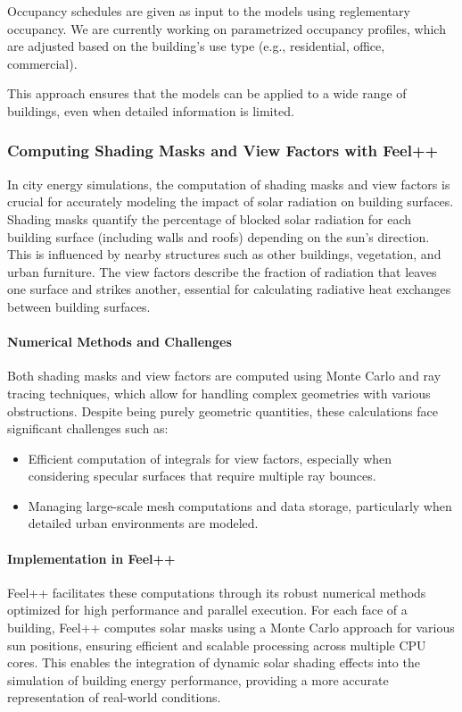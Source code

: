 \documentclass[runningheads]{llncs}
\begin{document}
Occupancy schedules are given as input to the models using reglementary occupancy.
We are currently working on parametrized occupancy profiles, which are adjusted based on the building's use type (e.g., residential, office, commercial).

This approach ensures that the models can be applied to a wide range of buildings, even when detailed information is limited.

\subsubsection{Computing Shading Masks and View Factors with Feel++}

In city energy simulations, the computation of shading masks and view factors is crucial for accurately modeling the impact of solar radiation on building surfaces. Shading masks quantify the percentage of blocked solar radiation for each building surface (including walls and roofs) depending on the sun's direction. This is influenced by nearby structures such as other buildings, vegetation, and urban furniture. The view factors describe the fraction of radiation that leaves one surface and strikes another, essential for calculating radiative heat exchanges between building surfaces.

\paragraph{Numerical Methods and Challenges}
Both shading masks and view factors are computed using Monte Carlo and ray tracing techniques, which allow for handling complex geometries with various obstructions. Despite being purely geometric quantities, these calculations face significant challenges such as:
\begin{itemize}
    \item Efficient computation of integrals for view factors, especially when considering specular surfaces that require multiple ray bounces.
    \item Managing large-scale mesh computations and data storage, particularly when detailed urban environments are modeled.
\end{itemize}

\paragraph{Implementation in Feel++}
Feel++ facilitates these computations through its robust numerical methods optimized for high performance and parallel execution. For each face of a building, Feel++ computes solar masks using a Monte Carlo approach for various sun positions, ensuring efficient and scalable processing across multiple CPU cores. This enables the integration of dynamic solar shading effects into the simulation of building energy performance, providing a more accurate representation of real-world conditions.
\end{document}
